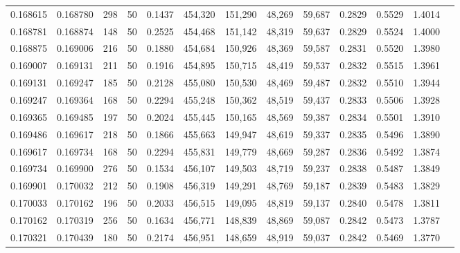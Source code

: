 \begin{tabular}{rrrrrrrrrrrrr}
0.168615 & 0.168780 &   298 &  50 &                                     0.1437 & 454,320 & 151,290 &  48,269 &  59,687 & 0.2829 & 0.5529 & 1.4014 \\
0.168781 & 0.168874 &   148 &  50 &                                     0.2525 & 454,468 & 151,142 &  48,319 &  59,637 & 0.2829 & 0.5524 & 1.4000 \\
0.168875 & 0.169006 &   216 &  50 &                                     0.1880 & 454,684 & 150,926 &  48,369 &  59,587 & 0.2831 & 0.5520 & 1.3980 \\
0.169007 & 0.169131 &   211 &  50 &                                     0.1916 & 454,895 & 150,715 &  48,419 &  59,537 & 0.2832 & 0.5515 & 1.3961 \\
0.169131 & 0.169247 &   185 &  50 &                                     0.2128 & 455,080 & 150,530 &  48,469 &  59,487 & 0.2832 & 0.5510 & 1.3944 \\
0.169247 & 0.169364 &   168 &  50 &                                     0.2294 & 455,248 & 150,362 &  48,519 &  59,437 & 0.2833 & 0.5506 & 1.3928 \\
0.169365 & 0.169485 &   197 &  50 &                                     0.2024 & 455,445 & 150,165 &  48,569 &  59,387 & 0.2834 & 0.5501 & 1.3910 \\
0.169486 & 0.169617 &   218 &  50 &                                     0.1866 & 455,663 & 149,947 &  48,619 &  59,337 & 0.2835 & 0.5496 & 1.3890 \\
0.169617 & 0.169734 &   168 &  50 &                                     0.2294 & 455,831 & 149,779 &  48,669 &  59,287 & 0.2836 & 0.5492 & 1.3874 \\
0.169734 & 0.169900 &   276 &  50 &                                     0.1534 & 456,107 & 149,503 &  48,719 &  59,237 & 0.2838 & 0.5487 & 1.3849 \\
0.169901 & 0.170032 &   212 &  50 &                                     0.1908 & 456,319 & 149,291 &  48,769 &  59,187 & 0.2839 & 0.5483 & 1.3829 \\
0.170033 & 0.170162 &   196 &  50 &                                     0.2033 & 456,515 & 149,095 &  48,819 &  59,137 & 0.2840 & 0.5478 & 1.3811 \\
0.170162 & 0.170319 &   256 &  50 &                                     0.1634 & 456,771 & 148,839 &  48,869 &  59,087 & 0.2842 & 0.5473 & 1.3787 \\
0.170321 & 0.170439 &   180 &  50 &                                     0.2174 & 456,951 & 148,659 &  48,919 &  59,037 & 0.2842 & 0.5469 & 1.3770 \\

\end{tabular}
